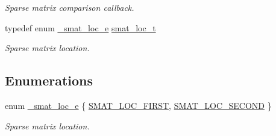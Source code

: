 \begin{CompactItemize}
\begin{CompactList}\small\item\em Sparse matrix comparison callback. \item\end{CompactList}\item 
typedef enum \hyperlink{group__dbprim__smat_ga70}{\_\-smat\_\-loc\_\-e} \hyperlink{group__dbprim__smat_ga6}{smat\_\-loc\_\-t}
\begin{CompactList}\small\item\em Sparse matrix location. \item\end{CompactList}\end{CompactItemize}
\subsection*{Enumerations}
\begin{CompactItemize}
\item 
enum \hyperlink{group__dbprim__smat_ga70}{\_\-smat\_\-loc\_\-e} \{ \hyperlink{group__dbprim__smat_gga70a137}{SMAT\_\-LOC\_\-FIRST}, 
\hyperlink{group__dbprim__smat_gga70a138}{SMAT\_\-LOC\_\-SECOND}
 \}
\begin{CompactList}\small\item\em Sparse matrix location. \item\end{CompactList}\end{CompactItemize}
